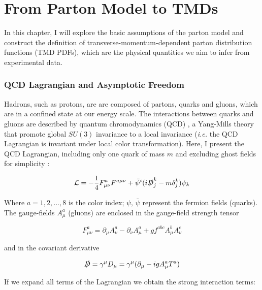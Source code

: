 \chapter[From Parton Model to TMDs]{From Parton Model to TMDs}
In this chapter, I will explore the basic assumptions of the parton model and construct the definition of transverse-momentum-dependent parton distribution functions (TMD PDFs), which are the physical quantities we aim to infer from experimental data.

\subsection[QCD Lagrangian and Asymptotic Freedom ]{QCD Lagrangian and Asymptotic Freedom}
Hadrons, such as protons, are are composed of partons, quarks and gluons, which are in a confined state at our energy scale. The interactions between quarks and gluons are described by quantum chromodynamics (QCD) \cite{Peskin:1995ev}, a Yang-Mills theory that promote global $SU(3)$ invariance to a local invariance (\textit{i.e.} the QCD Lagrangian is invariant under local color transformation). Here, I present the QCD Lagrangian, including only one quark of mass $m$ and excluding ghost fields for simplicity \cite{Grinstein:2003zz} :

\begin{equation}
\label{eq:lagrangian_QCD}
 \mathcal{L} = - \frac{1}{4} F_{\mu \nu}^aF^{a \mu \nu} + \bar{\psi}^i(i \slashed{D}_j^k - m\delta_j^k)\psi_k
\end{equation}

Where $a = 1, 2, ..., 8$ is the color index; $\psi \text{, }\bar{\psi}$ represent the fermion fields (quarks). The gauge-fields $A_{\mu}^a$ (gluons) are enclosed in the gauge-field strength tensor 

\begin{equation}
\label{eq:gluon-strength_tensor}
F_{\mu \nu}^a = \partial_\mu A_\nu^a - \partial_\nu A_\mu^a + g f^{abc} A_\mu^b A_\nu^c
\end{equation}

and in the covariant derivative 

\begin{equation}
\label{eq:covariant_derivative}
\slashed{D} = \gamma^{\mu} D_{\mu}  = \gamma^{\mu}(\partial_{\mu} - igA_{\mu}^a T^a)
\end{equation}

If we expand all terms of the Lagrangian we obtain the strong interaction terms:

